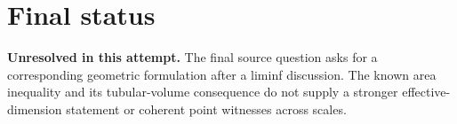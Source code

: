 \documentclass[11pt]{article}
\begin{document}
\section{Final status}
\textbf{Unresolved in this attempt.} The final source question asks for a corresponding geometric formulation after a liminf discussion. The known area inequality and its tubular-volume consequence do not supply a stronger effective-dimension statement or coherent point witnesses across scales.
\end{document}
